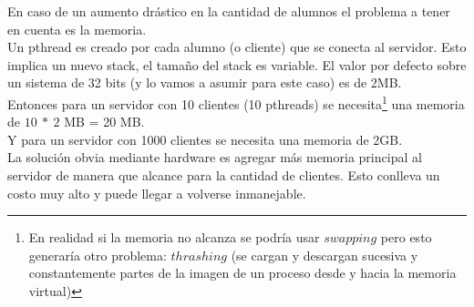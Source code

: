 En caso de un aumento drástico en la cantidad de alumnos el problema a tener en cuenta es la memoria.\\

Un pthread es creado por cada alumno (o cliente) que se conecta al servidor. Esto implica un nuevo stack, 
el tamaño del stack es variable. El valor por defecto sobre un sistema de 32 bits (y lo vamos a asumir para este caso) es de 2MB.\cite{manUnix}\\ 

Entonces para un servidor con 10 clientes (10 pthreads) se necesita\footnote{En realidad si la memoria no alcanza se podría usar $swapping$ pero esto generaría otro problema: $thrashing$ (se cargan y descargan sucesiva y constantemente partes de la imagen de un proceso desde y hacia la memoria virtual)}
una memoria de $10\ *\ 2$ MB = 20 MB.\\
Y para un servidor con 1000 clientes se necesita una memoria de 2GB.\\

La solución obvia mediante hardware es agregar más memoria principal al servidor de manera que alcance para la cantidad de clientes.
Esto conlleva un costo muy alto y puede llegar a volverse inmanejable.\\

